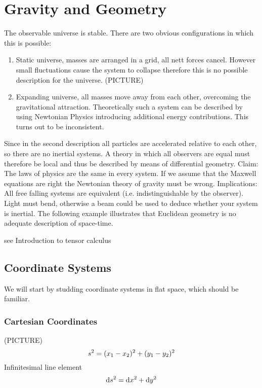 \chapter{Gravity and Geometry}
The observable universe is stable. There are two obvious configurations in which this is possible:
\begin{enumerate}
    \item Static universe, masses are arranged in a grid, all nett forces cancel. 
    	  However small fluctuations cause the system to collapse therefore this is
    	  no possible description for the universe. (PICTURE)
    \item Expanding universe, all masses move away from each other, overcoming the gravitational attraction. 
    	  Theoretically such a system can be described by using Newtonian Physics introducing additional energy contributions. 
    	  This turns out to be inconsistent.
\end{enumerate}
Since in the second description all particles are accelerated relative to each other, so there are no inertial systems. 
A theory in which all observers are equal must therefore be local and thus be described by means of differential geometry.
Claim: The laws of physics are the same in every system.
If we assume that the Maxwell equations are right the Newtonian theory of gravity must be wrong.
Implications:
All free falling systems are equivalent (i.e. indistinguishable by the observer). 
Light must bend, otherwise a beam could be used to deduce whether your system is inertial.
The following example illustrates that Euclidean geometry is no adequate description of space-time.
\begin{example}
see Introduction to tensor calculus
\end{example}
\section{Coordinate Systems}
We will start by studding coordinate systems in flat space, which should be familiar.
\subsection*{Cartesian Coordinates}
(PICTURE)
\begin{equation*}
    s^2=(x_1-x_2)^2+(y_1-y_2)^2\\
\end{equation*}
Infinitesimal line element
\begin{equation}
    \dif s^2=\dif x^2+\dif y^2  \label{eq:cartline}
\end{equation}

